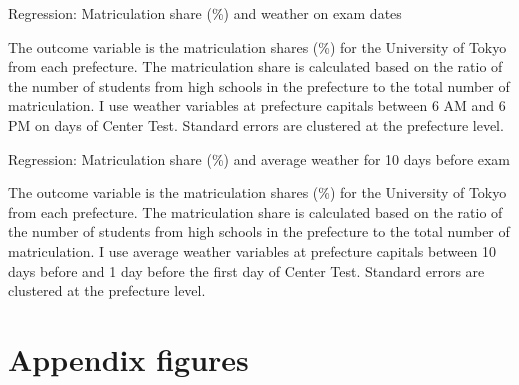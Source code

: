 \documentclass[12pt,letterpaper]{article}
\begin{document}
\begin{table}[H]
  \center
  \caption{Regression: Matriculation share (\%) and weather on exam dates}
  \small
  
  \label{tab:main_reg}
  \small
  \begin{tablenotes}
    \item
      The outcome variable is the matriculation shares (\%) for the University of Tokyo from each prefecture.
      The matriculation share is calculated based on the ratio of the number of students from high schools in the prefecture to the total number of matriculation.
      I use weather variables at prefecture capitals between 6 AM and 6 PM on days of Center Test.
      Standard errors are clustered at the prefecture level.
  \end{tablenotes}
\end{table}

\begin{table}[H]
  \center
  \caption{Regression: Matriculation share (\%) and average weather for 10 days before exam}
  
  \label{tab:reg_pre10}
  \small
  \begin{tablenotes}
    \item
      The outcome variable is the matriculation shares (\%) for the University of Tokyo from each prefecture.
      The matriculation share is calculated based on the ratio of the number of students from high schools in the prefecture to the total number of matriculation.
      I use average weather variables at prefecture capitals between 10 days before and 1 day before the first day of Center Test.
      Standard errors are clustered at the prefecture level.
  \end{tablenotes}
\end{table}

\appendix

\setcounter{figure}{0}
\setcounter{table}{0}
\renewcommand\thefigure{\Alph{section}.\arabic{figure}}
\renewcommand\thetable{\Alph{section}.\arabic{table}}
  
\section{Appendix figures}\label{sec:appendix_figure}
\end{document}
